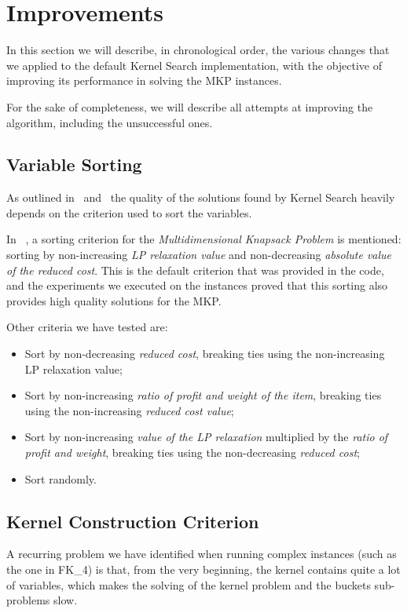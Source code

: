 \chapter{Improvements}\label{ch:improvements}
In this section we will describe, in chronological order, the various changes
that we applied to the default Kernel Search implementation,
with the objective of improving its performance
in solving the MKP instances.

For the sake of completeness, we will describe all attempts at improving
the algorithm, including the unsuccessful ones.


\section{Variable Sorting}
As outlined in~\cite{kernel:2010} and~\cite{kernel:2012} the quality of
the solutions found by Kernel Search heavily depends on the criterion used to sort the variables.

In ~\cite{kernel:2010}, a sorting criterion for the \textit{Multidimensional Knapsack Problem} is mentioned:
sorting by non-increasing \textit{LP relaxation value} and non-decreasing \textit{absolute value of the reduced cost}.
This is the default criterion that was provided in the code, and
the experiments we executed on the instances proved that this sorting also
provides high quality solutions for the MKP\@.

Other criteria we have tested are:
\begin{itemize}
    \item Sort by non-decreasing \textit{reduced cost}, breaking ties using the non-increasing {LP relaxation value};
    \item Sort by non-increasing \textit{ratio of profit and weight of the item}, breaking ties using the non-increasing \textit{reduced cost value};
    \item Sort by non-increasing \textit{value of the LP relaxation} multiplied by the \textit{ratio of profit and weight},    breaking ties using the non-decreasing \textit{reduced cost};
    \item Sort randomly.
\end{itemize}


\section{Kernel Construction Criterion}\label{sec:kernel_criteria}
A recurring problem we have identified when running complex
instances (such as the one in FK\_4) is that,
from the very beginning, the kernel contains quite a lot of variables,
which makes the solving of the kernel problem and the buckets sub-problems slow.

